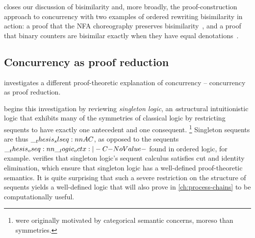  closes our discussion of bisimilarity and, more broadly, the proof-construction approach to concurrency with two examples of ordered rewriting bisimilarity in action: a proof that the \acs*{NFA} choreography preserves bisimilarity~, and a proof that binary counters are bisimilar exactly when they have equal denotations~.






\subsection{Concurrency as proof reduction}

 investigates a different proof-theoretic explanation of concurrency -- concurrency as proof reduction.

 begins this investigation by reviewing \emph{singleton logic}\autocites{Santocanale:FOSSACS02}{Fortier+Santocanale:CSL13}, an \emph{a}struc\-tural intuitionistic logic that exhibits many of the symmetries of classical logic by restricting sequents to have exactly one antecedent and one consequent.%
\footnote{ were originally motivated by categorical semantic concerns, moreso than symmetries.}
Singleton sequents are thus $\slseq{A |- C}$, as opposed to the sequents $\oseq{\octx |- C}$ found in ordered logic, for example.
 verifies that singleton logic's sequent calculus satisfies cut and identity elimination, which ensure that singleton logic has a well-defined proof-theoretic semantics.
It is quite surprising that such a severe restriction on the structure of sequents yields a well-defined logic that will also prove in \cref{ch:process-chains} to be computationally useful.

